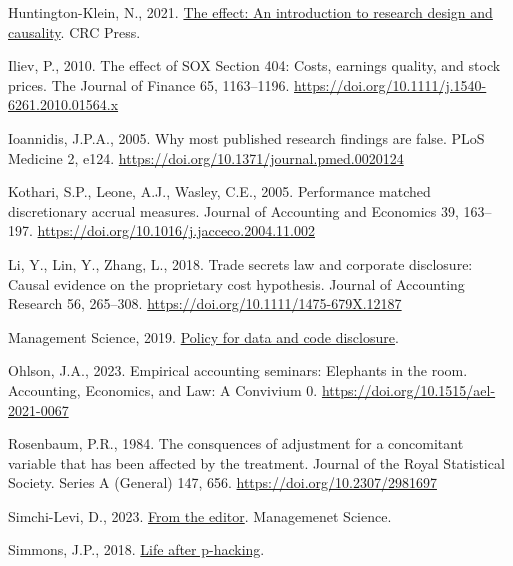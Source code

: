 \documentclass[
  letterpaper,
  DIV=11,
  numbers=noendperiod]{scrartcl}
\newlength{\cslhangindent}
\newlength{\cslentryspacingunit} %
\newenvironment{CSLReferences}[2] %
 {%
  \setlength{\parindent}{0pt}
  \ifodd #1
  \let\oldpar\par
  \def\par{\hangindent=\cslhangindent\oldpar}
  \fi
  \setlength{\parskip}{#2\cslentryspacingunit}
 }%
 {}
\begin{document}
\begin{CSLReferences}{1}{0}
\leavevmode{}%
Huntington-Klein, N., 2021.
\href{https://books.google.com/books?id=f0NOEAAAQBAJ}{The effect: An
introduction to research design and causality}. CRC Press.

\leavevmode{}%
Iliev, P., 2010. The effect of {SOX Section} 404: Costs, earnings
quality, and stock prices. The Journal of Finance 65, 1163--1196.
\url{https://doi.org/10.1111/j.1540-6261.2010.01564.x}

\leavevmode{}%
Ioannidis, J.P.A., 2005. Why most published research findings are false.
{PLoS} Medicine 2, e124.
\url{https://doi.org/10.1371/journal.pmed.0020124}

\leavevmode{}%
Kothari, S.P., Leone, A.J., Wasley, C.E., 2005. Performance matched
discretionary accrual measures. Journal of Accounting and Economics 39,
163--197. \url{https://doi.org/10.1016/j.jacceco.2004.11.002}

\leavevmode{}%
Li, Y., Lin, Y., Zhang, L., 2018. Trade secrets law and corporate
disclosure: Causal evidence on the proprietary cost hypothesis. Journal
of Accounting Research 56, 265--308.
\url{https://doi.org/10.1111/1475-679X.12187}

\leavevmode{}%
Management Science, 2019.
\href{https://pubsonline.informs.org/page/mnsc/datapolicy}{Policy for
data and code disclosure}.

\leavevmode{}%
Ohlson, J.A., 2023. Empirical accounting seminars: Elephants in the
room. Accounting, Economics, and Law: A Convivium 0.
\url{https://doi.org/10.1515/ael-2021-0067}

\leavevmode{}%
Rosenbaum, P.R., 1984. The consquences of adjustment for a concomitant
variable that has been affected by the treatment. Journal of the Royal
Statistical Society. Series A (General) 147, 656.
\url{https://doi.org/10.2307/2981697}

\leavevmode{}%
Simchi-Levi, D., 2023.
\href{https://www.informs.org/Blogs/ManSci-Blogs/From-the-Editor}{From
the editor}. Managemenet Science.

\leavevmode{}%
Simmons, J.P., 2018.
\href{https://www.youtube.com/watch?v=8wDwcp1EwNM}{Life after
p-hacking}.


\end{CSLReferences}
\end{document}
